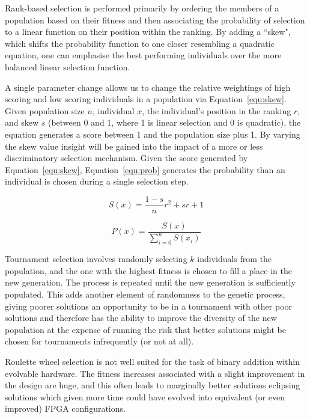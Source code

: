 Rank-based selection is performed primarily by ordering the members of a population
based on their fitness and then associating the probability of selection to a
linear function on their
position within the ranking. By adding a ``skew", which shifts the probability function
to one closer resembling a quadratic equation, one can emphasise the best performing
individuals over the more balanced linear selection function.

A single parameter change allows us to change the relative weightings of high scoring
and low scoring individuals in a population via Equation~\ref{equ:skew}. Given
population size $n$, individual $x$, the individual's position in the ranking $r$, and
skew $s$ (between 0 and 1, where 1 is linear selection and 0 is quadratic), the equation
generates a score between 1 and the population size plus 1. By varying the skew
value insight will be gained into the impact of a more or less discriminatory
selection mechanism. Given the score generated by Equation~\ref{equ:skew},
Equation~\ref{equ:prob} generates the probability than an individual is chosen during
a single selection step.

\begin{equation}
	\label{equ:skew}
	S(x) = \frac{1-s}{n}r^2 + sr + 1
\end{equation}

\begin{equation}
	\label{equ:prob}
	P(x) = \frac{S(x)}{\sum^{n}_{i=0} S(x_i)}
\end{equation}

Tournament selection involves randomly selecting $k$ individuals from the
population, and the one with the highest fitness is chosen to fill a place
in the new generation. The process is repeated until the new generation is
sufficiently populated. This adds another element of randomness to the
genetic process, giving poorer solutions an opportunity to be in a tournament
with other poor solutions and therefore has the ability to improve the
diversity of the new population at the expense of running the risk that
better solutions might be chosen for tournaments infrequently (or not at
all).

Roulette wheel selection is not well suited for the task of binary addition
within evolvable hardware. The fitness increases associated with a slight
improvement in the design are huge, and this often leads to marginally better
solutions eclipsing solutions which given more time could have evolved into
equivalent (or even improved) FPGA configurations.

